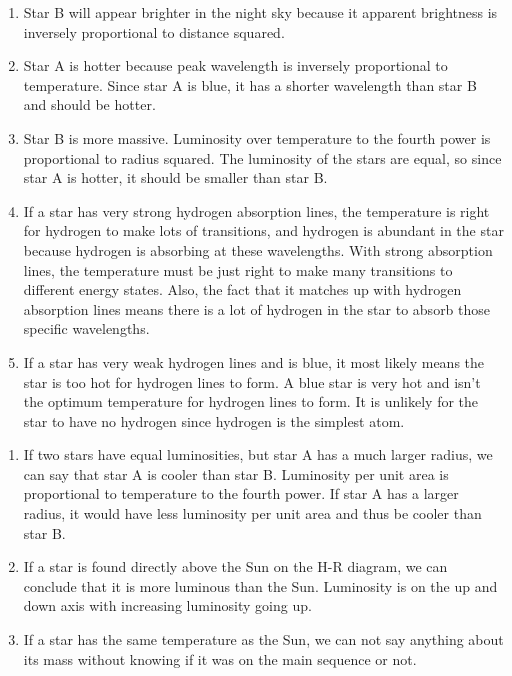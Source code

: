 \documentclass[../hw2.tex]{subfiles}
\begin{document}

    \begin{enumerate}
        \item {} Star B will appear brighter in the night sky because it apparent brightness is inversely proportional to distance squared.
        \item {} Star A is hotter because peak wavelength is inversely proportional to temperature. Since star A is blue, it has a shorter wavelength than star B and should be hotter.
        \item {} Star B is more massive. Luminosity over temperature to the fourth power is proportional to radius squared. The luminosity of the stars are equal, so since star A is hotter, it should be smaller than star B. 
        \item {} If a star has very strong hydrogen absorption lines, the temperature is right for hydrogen to make lots of transitions, and hydrogen is abundant in the star because hydrogen is absorbing at these wavelengths. With strong absorption lines, the temperature must be just right to make many transitions to different energy states. Also, the fact that it matches up with hydrogen absorption lines means there is a lot of hydrogen in the star to absorb those specific wavelengths.
        \item {} If a star has very weak hydrogen lines and is blue, it most likely means the star is too hot for hydrogen lines to form. A blue star is very hot and isn't the optimum temperature for hydrogen lines to form. It is unlikely for the star to have no hydrogen since hydrogen is the simplest atom. 
    \end{enumerate}
    
    \begin{enumerate}
        \item {} If two stars have equal luminosities, but star A has a much larger radius, we can say that star A is cooler than star B. Luminosity per unit area is proportional to temperature to the fourth power. If star A has a larger radius, it would have less luminosity per unit area and thus be cooler than star B.
        \item {} If a star is found directly above the Sun on the H-R diagram, we can conclude that it is more luminous than the Sun. Luminosity is on the up and down axis with increasing luminosity going up.
        \item {} If a star has the same temperature as the Sun, we can not say anything about its mass without knowing if it was on the main sequence or not.
    \end{enumerate}
    
\end{document}
